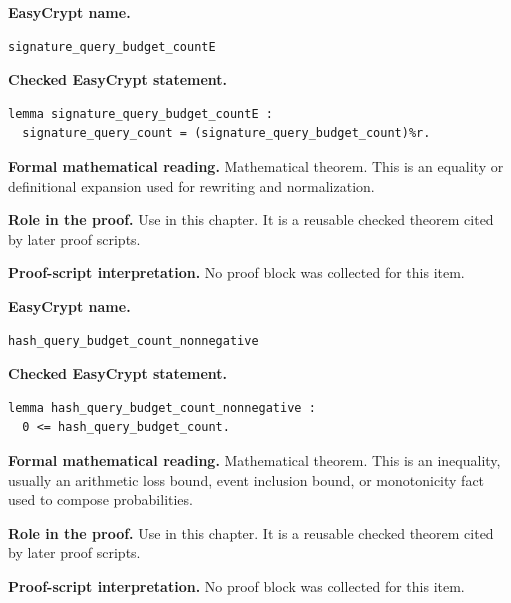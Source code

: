 \begin{formaltheorem}
\noindent\textbf{EasyCrypt name.}
\begin{lstlisting}[language=EasyCrypt,basicstyle=\ttfamily\scriptsize]
signature_query_budget_countE
\end{lstlisting}
\noindent\textbf{Checked EasyCrypt statement.}
\begin{lstlisting}[language=EasyCrypt,basicstyle=\ttfamily\scriptsize]
lemma signature_query_budget_countE :
  signature_query_count = (signature_query_budget_count)%r.
\end{lstlisting}
\noindent\textbf{Formal mathematical reading.}
Mathematical theorem. This is an equality or definitional expansion used for rewriting and normalization.

\noindent\textbf{Role in the proof.}
Use in this chapter. It is a reusable checked theorem cited by later proof scripts.

\noindent\textbf{Proof-script interpretation.}
No proof block was collected for this item.

\end{formaltheorem}

\begin{formaltheorem}
\noindent\textbf{EasyCrypt name.}
\begin{lstlisting}[language=EasyCrypt,basicstyle=\ttfamily\scriptsize]
hash_query_budget_count_nonnegative
\end{lstlisting}
\noindent\textbf{Checked EasyCrypt statement.}
\begin{lstlisting}[language=EasyCrypt,basicstyle=\ttfamily\scriptsize]
lemma hash_query_budget_count_nonnegative :
  0 <= hash_query_budget_count.
\end{lstlisting}
\noindent\textbf{Formal mathematical reading.}
Mathematical theorem. This is an inequality, usually an arithmetic loss bound, event inclusion bound, or monotonicity fact used to compose probabilities.

\noindent\textbf{Role in the proof.}
Use in this chapter. It is a reusable checked theorem cited by later proof scripts.

\noindent\textbf{Proof-script interpretation.}
No proof block was collected for this item.

\end{formaltheorem}

